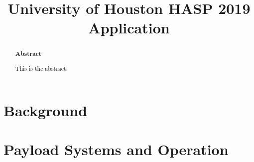 \documentclass[aps,superscriptaddress,floatfix,nofootinbib,showpacs,amsmath,amssymb,altaffilletter,floatfix,onecolumn]{revtex4-1}
\begin{document}
\title{University of Houston HASP 2019 Application}

\begin{abstract}
  \begin{center}
    {\bf Abstract}
  \end{center}
  
  This is the abstract.
  
  \newpage %
\end{abstract}


\setlength{\parindent}{1em}
\setdefaultleftmargin{1em}{1em}{}{}{}{}
\setcounter{page}{0}\thispagestyle{empty}
\maketitle
\onecolumngrid
\setcounter{tocdepth}{2}
\setcounter{page}{0}\thispagestyle{empty}
\tableofcontents
\setcounter{page}{0}\thispagestyle{empty}
\newpage


\section{Background}
    
    

\section{Payload Systems and Operation}
\label{sec:PayloadSystems}
    
    
    
    






                





	

\end{document}
